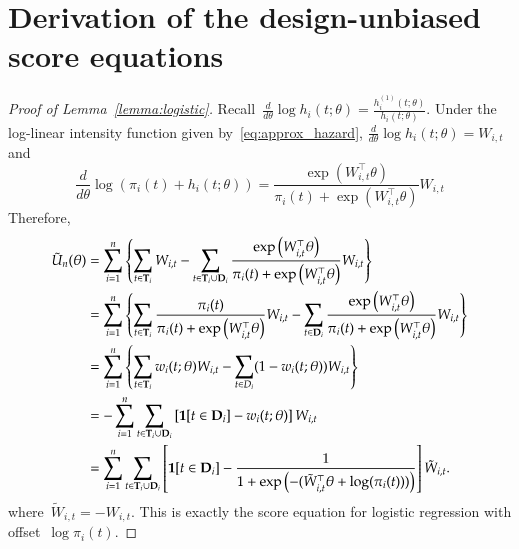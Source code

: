 \documentclass[11pt]{amsart}
\def\bfT{{\bf T}}
\def\bfD{{\bf D}}
\begin{document}



\appendix

\section{Derivation of the design-unbiased score equations}

\begin{proof}[Proof of Lemma~\ref{lemma:logistic}]
Recall~$\frac{d}{d\theta} \log h_i (t; \theta) = \frac{h^{(1)}_i (t; \theta)}{h_i (t; \theta)}$. Under the log-linear intensity function given by~\eqref{eq:approx_hazard}, $\frac{d}{d\theta} \log h_i (t; \theta) = W_{i,t}$ and
\[
\frac{d}{d \theta} \log \left( \pi_i (t) + h_i (t;\theta) \right) =
\frac{\exp \left( W_{i,t}^\top \theta \right)}{\pi_i (t) + \exp
  \left( W_{i,t}^\top \theta \right)} W_{i,t}
\]
Therefore,
\begin{align*}
\tilde U_n (\theta)
  &= \sum_{i=1}^n \left \{ \sum_{t \in \bfT_i} W_{i,t} - \sum_{t \in \bfT_i \cup \bfD_i} \frac{\exp \left( W_{i,t}^\top \theta \right)}{\pi_i (t) + \exp \left( W_{i,t}^\top \theta \right)}  W_{i,t} \right \} \\
  &= \sum_{i=1}^n \left \{ \sum_{t \in \bfT_i} \frac{\pi_i (t)}{\pi_i (t) + \exp \left( W_{i,t}^\top \theta \right)} W_{i,t} - \sum_{t \in \bfD_i} \frac{\exp \left( W_{i,t}^\top \theta \right)}{\pi_i (t) + \exp \left( W_{i,t}^\top \theta \right)} W_{i,t} \right \} \\
  &= \sum_{i=1}^n \left \{ \sum_{t \in \bfT_i} w_{i} (t; \theta) W_{i,t} -
    \sum_{t \in D_i} (1 - w_i (t; \theta)) W_{i,t} \right \} \\
  &= - \sum_{i=1}^n \sum_{t \in \bfT_i \cup \bfD_i} \left[ {\bf 1} [t \in \bfD_i]  - w_{i} (t; \theta) \right] W_{i,t} \\
  &= \sum_{i=1}^n \sum_{t \in \bfT_i \cup \bfD_i}
    \left[ {\bf 1} [t \in \bfD_i]  - \frac{1}{1 + \exp\left( - (
          \tilde W_{i,t}^\top \theta + \log (\pi_i (t) ) ) \right)}
    \right] \tilde W_{i,t}.
\end{align*}
where~$\tilde W_{i,t} = - W_{i,t}$. This is exactly the score equation
for logistic regression with offset~$\log \pi_i (t)$.
\end{proof}
\end{document}

